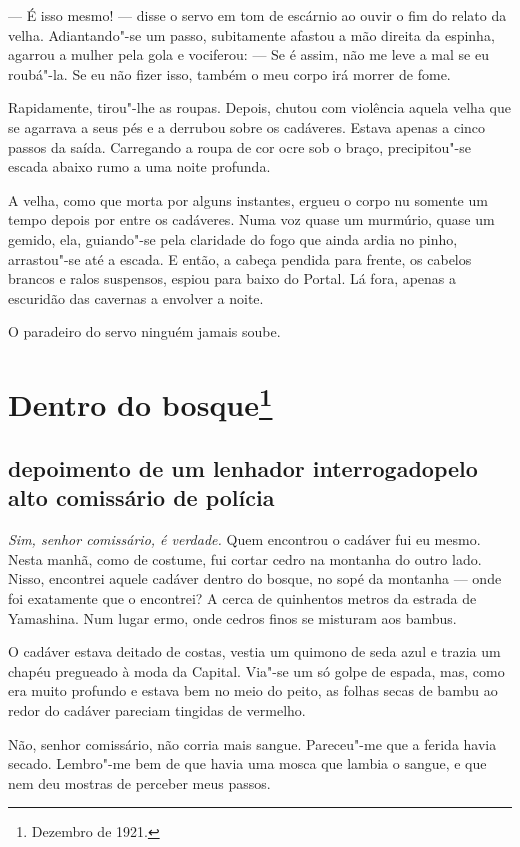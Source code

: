 --- É isso mesmo! --- disse o servo em tom de escárnio ao ouvir o fim do
relato da velha. Adiantando"-se um passo, subitamente afastou a mão
direita da espinha, agarrou a mulher pela gola e vociferou: --- Se é
assim, não me leve a mal se eu roubá"-la. Se eu não fizer isso, também o
meu corpo irá morrer de fome.

Rapidamente, tirou"-lhe as roupas. Depois, chutou com violência aquela
velha que se agarrava a seus pés e a derrubou sobre os cadáveres.
Estava apenas a cinco passos da saída. Carregando a roupa de cor ocre
sob o braço, precipitou"-se escada abaixo rumo a uma noite profunda.

A velha, como que morta por alguns instantes, ergueu o corpo nu somente
um tempo depois por entre os cadáveres. Numa voz quase um murmúrio,
quase um gemido, ela, guiando"-se pela claridade do fogo que ainda ardia
no pinho, arrastou"-se até a escada. E então, a cabeça pendida para
frente, os cabelos brancos e ralos suspensos, espiou para baixo do
Portal. Lá fora, apenas a escuridão das cavernas a envolver a noite.

O paradeiro do servo ninguém jamais soube.

\chapter{Dentro do bosque\footnote{Dezembro de 1921.}}

\section*{depoimento de um lenhador interrogado\break pelo alto comissário de polícia}

\textit{Sim, senhor comissário, é verdade.} Quem encontrou o cadáver fui eu mesmo. Nesta manhã, como de costume, fui
cortar cedro na montanha do outro lado. Nisso, encontrei aquele cadáver
dentro do bosque, no sopé da montanha --- onde foi exatamente que o
encontrei? A cerca de quinhentos metros da estrada de Yamashina. Num
lugar ermo, onde cedros finos se misturam aos bambus.

O cadáver estava deitado de costas, vestia um quimono de seda azul e
trazia um chapéu pregueado à moda da Capital. Via"-se um só golpe de
espada, mas, como era muito profundo e estava bem no meio do peito, as
folhas secas de bambu ao redor do cadáver pareciam tingidas de
vermelho.

 Não, senhor comissário, não corria mais sangue. Pareceu"-me que a ferida
havia secado. Lembro"-me bem de que havia uma mosca que lambia o sangue,
e que nem deu mostras de perceber meus passos.

